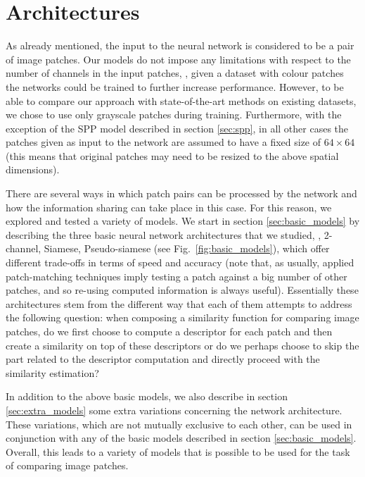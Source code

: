\documentclass[10pt,twocolumn,letterpaper]{article}
\begin{document}
\section{Architectures}
As already mentioned, the input to the  neural network 
is considered to be a pair of image patches.  Our models do not 
impose any limitations with respect to the number of channels in the input patches, \ie, given a dataset with
colour patches the networks could be trained to further increase performance.
However, to be able to compare 
our approach with state-of-the-art methods on existing datasets, we chose to use only grayscale patches during training. 
Furthermore, with the exception of the SPP model described in section \ref{sec:spp}, in all other cases the  patches given as input to the network are  assumed to have  a fixed size of $64\times64$ (this means that original patches may need to be resized to the above spatial dimensions). 

There are several ways in which patch pairs can be processed by the network and how 
the information sharing can take place in this case. For this reason, we explored and tested a variety of models. We start in section \ref{sec:basic_models}  by describing   the three basic neural network architectures that we studied, \ie, 2-channel, Siamese, Pseudo-siamese (see Fig.~\ref{fig:basic_models}), which offer different trade-offs in terms of speed and 
accuracy (note that, as usually, applied patch-matching techniques imply testing a 
patch against a big number of other patches, and so re-using computed information is always useful). Essentially these architectures stem from the 
different way that each of them attempts to address the following question: when composing a similarity function for comparing image patches, do we   first choose to compute  a descriptor for each patch and then create a similarity on top of these descriptors or do we perhaps choose to skip the part related to the descriptor computation and directly proceed with the  similarity estimation? 

In addition to the above basic models, we also describe in section \ref{sec:extra_models} some extra  variations concerning the  network architecture. %
 These variations, which are not mutually exclusive to each other,  can be used in conjunction with any of the basic models described in section \ref{sec:basic_models}. %
Overall, this  leads to  a variety of  models that is possible to be used for the task of comparing image patches.
\end{document}
